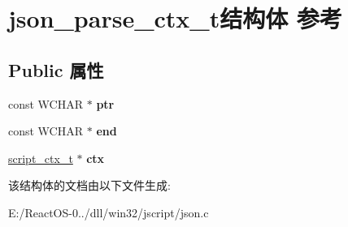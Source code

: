 \hypertarget{structjson__parse__ctx__t}{}\section{json\+\_\+parse\+\_\+ctx\+\_\+t结构体 参考}
\label{structjson__parse__ctx__t}
\subsection*{Public 属性}
\begin{DoxyCompactItemize}
\item 
\mbox{\label{structjson__parse__ctx__t_a02f4eea543ca7fcbc980940ff68a77a9}} 
const W\+C\+H\+AR $\ast$ {\bfseries ptr}
\item 
\mbox{\label{structjson__parse__ctx__t_ad9afe95a1756ff3a05d252e35edbb485}} 
const W\+C\+H\+AR $\ast$ {\bfseries end}
\item 
\mbox{\label{structjson__parse__ctx__t_a4f24f5ea83ec377428c077505a0ea9e4}} 
\hyperlink{struct__script__ctx__t}{script\+\_\+ctx\+\_\+t} $\ast$ {\bfseries ctx}
\end{DoxyCompactItemize}


该结构体的文档由以下文件生成\+:\begin{DoxyCompactItemize}
\item 
E\+:/\+React\+O\+S-\/0../dll/win32/jscript/json.\+c\end{DoxyCompactItemize}
